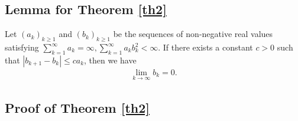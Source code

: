 \documentclass[twoside,11pt]{article}
\begin{document}
\subsection{Lemma for Theorem \ref{th2}}
\begin{lemma}
\label{Lemab} 
Let $\left(  a_k\right)_{k\ge 1} $ and $\left(  b_k\right)_{k\ge 1}$ be the sequences of non-negative real values satisfying $\sum_{k=1}^{\infty}a_k=\infty,\sum_{k=1}^{\infty}a_k b_k^2<\infty$. If there exists a constant $c>0$ such that $|b_{k+1}-b_{k}|\le c a_k$, then we have
\begin{gather} 
   	\lim_{k\rightarrow\infty}b_k=0.\nonumber
\end{gather}
\end{lemma}
   
\subsection{Proof of Theorem \ref{th2}}\label{Proof of th2}
\end{document}

